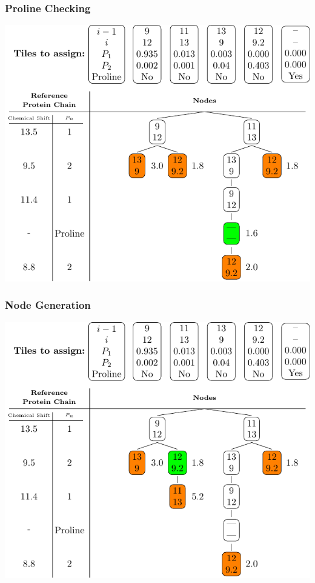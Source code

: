 \documentclass{beamer}
\begin{document}
\begin{frame}
	\frametitle{Proline Checking}
	\vspace{-.5cm} 
	\center
	\includegraphics[width=.9\textwidth]{tilePlacement/step8}
\end{frame}

\begin{frame}
	\frametitle{Node Generation}
	\vspace{-.5cm} 
	\center
	\includegraphics[width=.9\textwidth]{tilePlacement/step9}
\end{frame}
\end{document}
